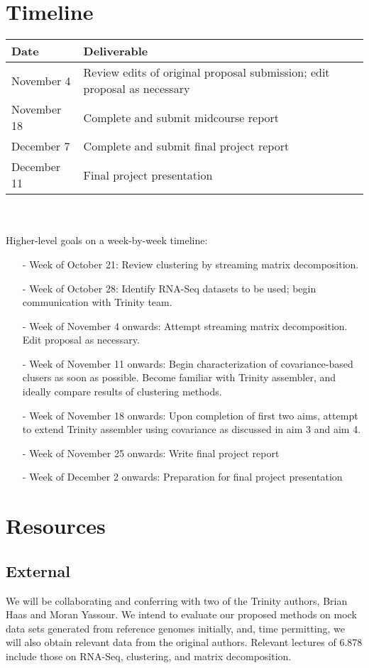 \documentclass[11pt]{article}
\begin{document}
\section{Timeline}

\begin{tabular}{l l}
 \textbf{Date} & \textbf{Deliverable}\\\hline
  November 4	& Review edits of original proposal submission; edit proposal as necessary\\
 November 18	& Complete and submit midcourse report\\
 December 7 	& Complete and submit final project report\\
 December 11 	& Final project presentation\\
\end{tabular}\\\\
\noindent Higher-level goals on a week-by-week timeline:
\begin{itemize}
 \item[-] Week of October 21: Review clustering by streaming matrix decomposition.
 \item[-] Week of October 28: Identify RNA-Seq datasets to be used; begin communication with Trinity team.
 \item[-] Week of November 4 onwards: Attempt streaming matrix decomposition. Edit proposal as necessary.
 \item[-] Week of November 11 onwards: Begin characterization of covariance-based clusers as soon as possible. Become familiar with Trinity assembler, and ideally compare results of clustering methods.
 \item[-] Week of November 18 onwards: Upon completion of first two aims, attempt to extend Trinity assembler using covariance as discussed in aim 3 and aim 4.
 \item[-] Week of November 25 onwards: Write final project report
 \item[-] Week of December 2 onwards: Preparation for final project presentation
 \end{itemize}


\section{Resources}
\subsection{External}
We will be collaborating and conferring with two of the Trinity authors, Brian Haas and Moran Yassour. We intend to evaluate our proposed methods on mock data sets generated from reference genomes initially, and, time permitting, we will also obtain relevant data from the original authors. Relevant lectures of 6.878 include those on RNA-Seq, clustering, and matrix decomposition.
\end{document}
